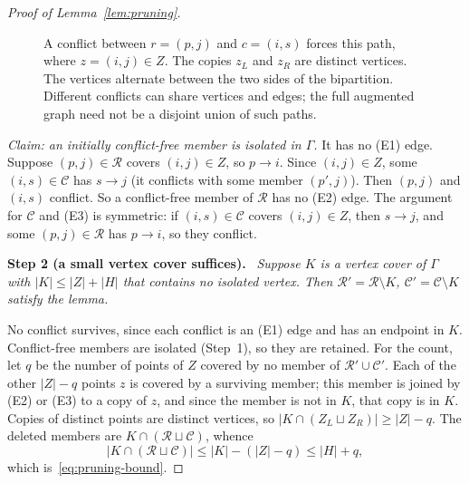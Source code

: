 \documentclass[11pt]{article}
\theoremstyle{remark}
\newcommand{\abs}[1]{\lvert #1\rvert}
\newcommand{\step}[1]{\par\medskip\noindent\textbf{Step #1.}\ }
\begin{document}
\begin{proof}[Proof of Lemma~\ref{lem:pruning}]
\begin{figure}[!ht]
 \centering

 \caption{A conflict between $r=(p,j)$ and $c=(i,s)$ forces this path,
 where $z=(i,j)\in Z$. The copies $z_L$ and $z_R$ are distinct vertices.
 The vertices alternate between the two sides of the bipartition.
 Different conflicts can share vertices and edges; the full augmented
 graph need not be a disjoint union of such paths.}
 \label{fig:pruning}
\end{figure}

\emph{Claim: an initially conflict-free member is isolated in $\Gamma$.}
It has no (E1) edge. Suppose $(p,j)\in\mathcal R$ covers $(i,j)\in Z$, so
$p\to i$. Since $(i,j)\in Z$, some $(i,s)\in\mathcal C$ has $s\to j$ (it
conflicts with some member $(p',j)$). Then $(p,j)$ and $(i,s)$ conflict. So a
conflict-free member of $\mathcal R$ has no (E2) edge. The argument for
$\mathcal C$ and (E3) is symmetric: if $(i,s)\in\mathcal C$ covers
$(i,j)\in Z$, then $s\to j$, and some $(p,j)\in\mathcal R$ has $p\to i$, so
they conflict.

\step{2 (a small vertex cover suffices)}
\emph{Suppose $K$ is a vertex cover of $\Gamma$ with
$\abs K\le\abs Z+\abs H$ that contains no isolated vertex. Then
$\mathcal R'=\mathcal R\setminus K$, $\mathcal C'=\mathcal C\setminus K$
satisfy the lemma.}

No conflict survives, since each conflict is an (E1) edge and has an endpoint
in $K$. Conflict-free members are isolated (Step~1), so they are retained. For
the count, let $q$ be the number of points of $Z$ covered by no member of
$\mathcal R'\cup\mathcal C'$. Each of the other $\abs Z-q$ points $z$ is
covered by a surviving member; this member is joined by (E2) or (E3) to a copy
of $z$, and since the member is not in $K$, that copy is in $K$. Copies of
distinct points are distinct vertices, so
$\abs{K\cap(Z_L\sqcup Z_R)}\ge\abs Z-q$. The deleted members are
$K\cap(\mathcal R\sqcup\mathcal C)$, whence
\begin{equation}\label{eq:cover-charge}
 \abs{K\cap(\mathcal R\sqcup\mathcal C)}
 \leq \abs K-(\abs Z-q)\leq\abs H+q,
\end{equation}
which is~\eqref{eq:pruning-bound}.


\end{proof}
\end{document}
